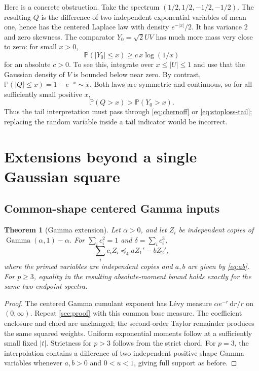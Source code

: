 \documentclass[11pt]{article}
\numberwithin{equation}{section}
\newtheorem{theorem}{Theorem}[section]
\theoremstyle{definition}
\theoremstyle{remark}
\newcommand{\Prob}{\mathbb P}
\newcommand{\dd}{\,\mathrm d}
\DeclareMathOperator{\GammaDist}{Gamma}
\begin{document}
Here is a concrete obstruction. Take the spectrum $(1/2,1/2,-1/2,-1/2)$. The resulting $Q$ is the difference of two independent exponential variables of mean one, hence has the centered Laplace law with density $e^{-|x|}/2$. It has variance $2$ and zero skewness. The comparator $Y_0=\sqrt2 UV$ has much more mass very close to zero: for small $x>0$,
\[
\Prob(|Y_0|\leq x)\geq c\,x\log(1/x)
\]
for an absolute $c>0$. To see this, integrate over $x\leq |U|\leq1$ and use that the Gaussian density of $V$ is bounded below near zero. By contrast, $\Prob(|Q|\leq x)=1-e^{-x}\sim x$. Both laws are symmetric and continuous, so for all sufficiently small positive $x$,
\[
\Prob(Q>x)>\Prob(Y_0>x).
\]
Thus the tail interpretation must pass through \eqref{eq:chernoff} or \eqref{eq:stoploss-tail}; replacing the random variable inside a tail indicator would be incorrect.

\section{Extensions beyond a single Gaussian square}
\label{sec:extensions}

\subsection{Common-shape centered Gamma inputs}
\begin{theorem}[Gamma extension]\label{thm:gamma}
Let $\alpha>0$, and let $Z_i$ be independent copies of
$\GammaDist(\alpha,1)-\alpha$. For $\sum_i c_i^2=1$ and $\delta=\sum_i c_i^3$,
\begin{equation}\label{eq:gamma-order}
\sum_i c_iZ_i\preceq_4 aZ_1'-bZ_2',
\end{equation}
where the primed variables are independent copies and $a,b$ are given by \eqref{eq:ab}. For $p\geq3$, equality in the resulting absolute-moment bound holds exactly for the same two-endpoint spectra.
\end{theorem}
\begin{proof}
The centered Gamma cumulant exponent has L\'evy measure
$\alpha e^{-r}\dd r/r$ on $(0,\infty)$. Repeat \cref{sec:proof} with this common base measure. The coefficient enclosure and chord are unchanged; the second-order Taylor remainder produces the same squared weights. Uniform exponential moments follow at a sufficiently small fixed $|t|$. Strictness for $p>3$ follows from the strict chord. For $p=3$, the interpolation contains a difference of two independent positive-shape Gamma variables whenever $a,b>0$ and $0<u<1$, giving full support as before.
\end{proof}
\end{document}
